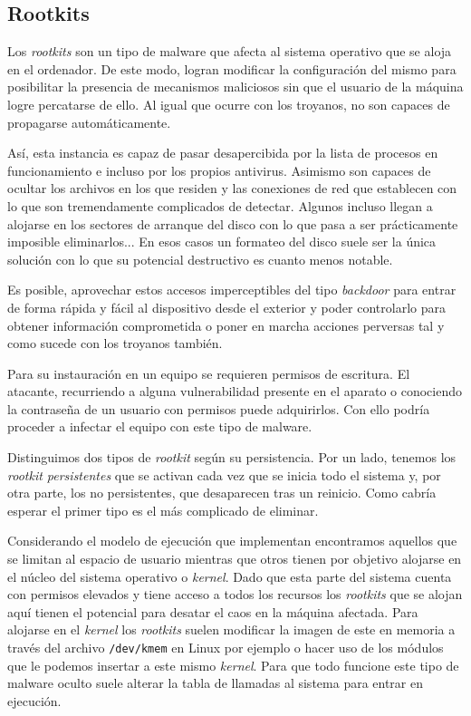 \documentclass[12pt]{article}
\newcommand{\newpar} {
    \vskip 0.5cm
}
\begin{document}
        \subsection{Rootkits}
            Los \textit{rootkits} son un tipo de malware que afecta al sistema operativo que se aloja en el ordenador. De este modo, logran modificar la configuración del mismo para posibilitar la presencia de mecanismos maliciosos sin que el usuario de la máquina logre percatarse de ello. Al igual que ocurre con los troyanos, no son capaces de propagarse automáticamente.

            \newpar

            Así, esta instancia es capaz de pasar desapercibida por la lista de procesos en funcionamiento e incluso por los propios antivirus. Asimismo son capaces de ocultar los archivos en los que residen y las conexiones de red que establecen con lo que son tremendamente complicados de detectar. Algunos incluso llegan a alojarse en los sectores de arranque del disco con lo que pasa a ser prácticamente imposible eliminarlos... En esos casos un formateo del disco suele ser la única solución con lo que su potencial destructivo es cuanto menos notable.

            \newpar

            Es posible, aprovechar estos accesos imperceptibles del tipo \textit{backdoor} para entrar de forma rápida y fácil al dispositivo desde el exterior y poder controlarlo para obtener información comprometida o poner en marcha acciones perversas tal y como sucede con los troyanos también.

            \newpar

            Para su instauración en un equipo se requieren permisos de escritura. El atacante, recurriendo a alguna vulnerabilidad presente en el aparato o conociendo la contraseña de un usuario con permisos puede adquirirlos. Con ello podría proceder a infectar el equipo con este tipo de malware.

            \newpar

            Distinguimos dos tipos de \textit{rootkit} según su persistencia. Por un lado, tenemos los \textit{rootkit persistentes} que se activan cada vez que se inicia todo el sistema y, por otra parte, los no persistentes, que desaparecen tras un reinicio. Como cabría esperar el primer tipo es el más complicado de eliminar.

            \newpar

            Considerando el modelo de ejecución que implementan encontramos aquellos que se limitan al espacio de usuario mientras que otros tienen por objetivo alojarse en el núcleo del sistema operativo o \textit{kernel}. Dado que esta parte del sistema cuenta con permisos elevados y tiene acceso a todos los recursos los \textit{rootkits} que se alojan aquí tienen el potencial para desatar el caos en la máquina afectada. Para alojarse en el \textit{kernel} los \textit{rootkits} suelen modificar la imagen de este en memoria a través del archivo \texttt{/dev/kmem} en Linux por ejemplo o hacer uso de los módulos que le podemos insertar a este mismo \textit{kernel}. Para que todo funcione este tipo de malware oculto suele alterar la tabla de llamadas al sistema para entrar en ejecución.
\end{document}
